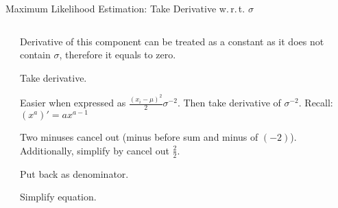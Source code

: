 \begin{frame}{Maximum Likelihood Estimation: Take Derivative w.\,r.\,t. $\sigma$}
\begin{columns}
\begin{column}{0.5\textwidth}
		\end{column}
		\begin{column}{0.5\textwidth}
			\begin{enumerate}
				{
				\item Derivative of this component can be treated as a constant as it does not contain $\sigma$, therefore it equals to zero.
				\item Take derivative.
				\item Easier when expressed as $\frac{(x_i-\mu)^2}{2}\sigma^{-2}$. Then take derivative of $\sigma^{-2}$. Recall: $(x^a)'=ax^{a-1}$
				\item Two minuses cancel out (minus before sum and minus of $(-2)$). Additionally, simplify by cancel out $\frac{2}{2}$.
				\item Put back as denominator.
				\item Simplify equation.
				      }
			\end{enumerate}
		\end{column}
	\end{columns}
\end{frame}

